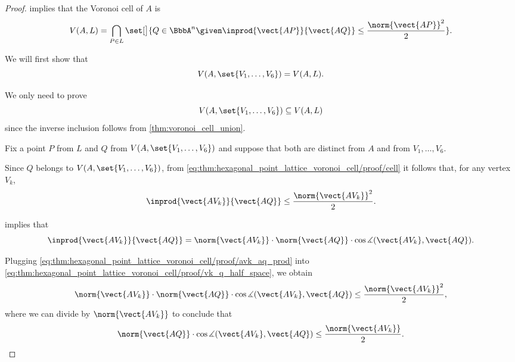 \begin{proof}
   implies that the Voronoi cell of \( A \) is
  \begin{equation}\label{eq:thm:hexagonal_point_lattice_voronoi_cell/proof/cell}
    V(A, L) = \bigcap_{P \in L} \set[\big]{ Q \in \BbbA^n \given \inprod {\vect{AP}} {\vect{AQ}} \leq \frac {\norm{\vect{AP}}^2} 2 }.
  \end{equation}

   We will first show that
  \begin{equation*}
    V(A, \set{ V_1, \ldots, V_6 }) = V(A, L).
  \end{equation*}

  We only need to prove
  \begin{equation*}
    V(A, \set{ V_1, \ldots, V_6 }) \subseteq V(A, L)
  \end{equation*}
  since the inverse inclusion follows from \cref{thm:voronoi_cell_union}.

  Fix a point \( P \) from \( L \) and \( Q \) from \( V(A, \set{ V_1, \ldots, V_6 }) \) and suppose that both are distinct from \( A \) and from \( V_1, \ldots, V_6 \).

  Since \( Q \) belongs to \( V(A, \set{ V_1, \ldots, V_6 }) \), from \eqref{eq:thm:hexagonal_point_lattice_voronoi_cell/proof/cell} it follows that, for any vertex \( V_k \),
  \begin{equation}\label{eq:thm:hexagonal_point_lattice_voronoi_cell/proof/vk_q_half_space}
    \inprod {\vect{AV_k}} {\vect{AQ}} \leq \frac {\norm{\vect{AV_k}}^2} 2.
  \end{equation}

   implies that
  \begin{equation}\label{eq:thm:hexagonal_point_lattice_voronoi_cell/proof/avk_aq_prod}
    \inprod {\vect{AV_k}} {\vect{AQ}}
    =
    \norm{\vect{AV_k}} \cdot \norm{\vect{AQ}} \cdot \cos\measuredangle(\vect{AV_k}, \vect{AQ}).
  \end{equation}

  Plugging \eqref{eq:thm:hexagonal_point_lattice_voronoi_cell/proof/avk_aq_prod} into \eqref{eq:thm:hexagonal_point_lattice_voronoi_cell/proof/vk_q_half_space}, we obtain
  \begin{equation*}
    \norm{\vect{AV_k}} \cdot \norm{\vect{AQ}} \cdot \cos\measuredangle(\vect{AV_k}, \vect{AQ}) \leq \frac {\norm{\vect{AV_k}}^2} 2,
  \end{equation*}
  where we can divide by \( \norm{\vect{AV_k}} \) to conclude that
  \begin{equation}\label{eq:thm:hexagonal_point_lattice_voronoi_cell/proof/aq_cos_avk_ineq}
    \norm{\vect{AQ}} \cdot \cos\measuredangle(\vect{AV_k}, \vect{AQ}) \leq \frac {\norm{\vect{AV_k}}} 2.
  \end{equation}


\end{proof}
